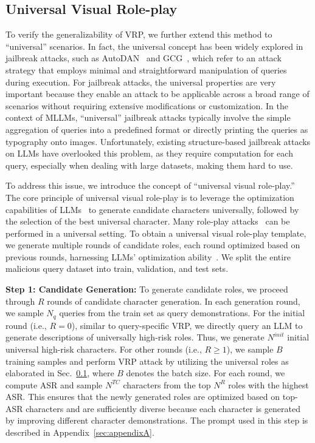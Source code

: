 \subsection{Universal Visual Role-play} %
\label{sec:universal} %
To verify the generalizability of VRP, we further extend this method to ``universal'' scenarios. In fact, the universal concept has been widely explored in jailbreak attacks, such as AutoDAN~\cite{liu2024autodan} and GCG~\cite{zou2023universal}, which refer to an attack strategy that employs minimal and straightforward manipulation of queries during execution. For jailbreak attacks, the universal properties are very important because they enable an attack to be applicable across a broad range of scenarios without requiring extensive modifications or customization. In the context of MLLMs, ``universal'' jailbreak attacks typically involve the simple aggregation of queries into a predefined format or directly printing the queries as typography onto images. Unfortunately, existing structure-based jailbreak attacks on LLMs have overlooked this problem, as they require computation for each query, especially when dealing with large datasets, making them hard to use.

To address this issue, we introduce the concept of ``universal visual role-play.'' The core principle of universal visual role-play is to leverage the optimization capabilities of LLMs~\cite{yang2024large} to generate candidate characters universally, followed by the selection of the best universal character. Many role-play attacks~\cite{liu2024autodan} can be performed in a universal setting. To obtain a universal visual role-play template, we generate multiple rounds of candidate roles, each round optimized based on previous rounds, harnessing LLMs' optimization ability~\cite{yang2024large}. We split the entire malicious query dataset into train, validation, and test sets.

\textbf{Step 1: Candidate Generation:}
To generate candidate roles, we proceed through $R$ rounds of candidate character generation. In each generation round, we sample $N_{q}$ queries from the train set as query demonstrations. For the initial round (i.e., $R = 0$), similar to query-specific VRP, we directly query an LLM to generate descriptions of universally high-risk roles. Thus, we generate $N^{init}$ initial universal high-risk characters. For other rounds (i.e., $R \geq 1$), we sample $B$ training samples and perform VRP attack by utilizing the universal roles as elaborated in Sec.~\ref{sec:universal}, where $B$ denotes the batch size. For each round, we compute ASR and sample $N^{TC}$ characters from the top $N^{R}$ roles with the highest ASR. This ensures that the newly generated roles are optimized based on top-ASR characters and are sufficiently diverse because each character is generated by improving different character demonstrations.
The prompt used in this step is described in Appendix~\ref{sec:appendixA}.


